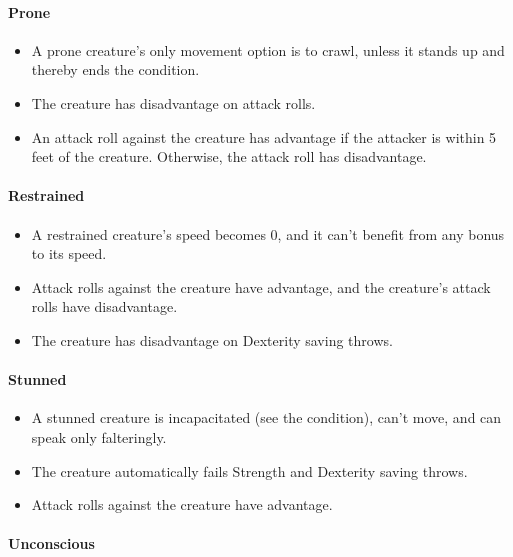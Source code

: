\documentclass[
]{article}
\providecommand{\tightlist}{%
  \setlength{\itemsep}{0pt}\setlength{\parskip}{0pt}}
\begin{document}
\hypertarget{prone}{%
\paragraph{Prone}\label{prone}}

\begin{itemize}
\tightlist
\item
  A prone creature's only movement option is to crawl, unless it stands
  up and thereby ends the condition.
\item
  The creature has disadvantage on attack rolls.
\item
  An attack roll against the creature has advantage if the attacker is
  within 5 feet of the creature. Otherwise, the attack roll has
  disadvantage.
\end{itemize}

\hypertarget{restrained}{%
\paragraph{Restrained}\label{restrained}}

\begin{itemize}
\tightlist
\item
  A restrained creature's speed becomes 0, and it can't benefit from any
  bonus to its speed.
\item
  Attack rolls against the creature have advantage, and the creature's
  attack rolls have disadvantage.
\item
  The creature has disadvantage on Dexterity saving throws.
\end{itemize}

\hypertarget{stunned}{%
\paragraph{Stunned}\label{stunned}}

\begin{itemize}
\tightlist
\item
  A stunned creature is incapacitated (see the condition), can't move,
  and can speak only falteringly.
\item
  The creature automatically fails Strength and Dexterity saving throws.
\item
  Attack rolls against the creature have advantage.
\end{itemize}

\hypertarget{unconscious}{%
\paragraph{Unconscious}\label{unconscious}}
\end{document}
